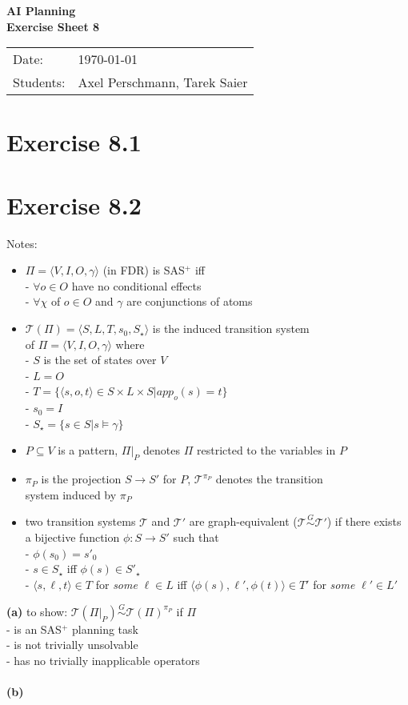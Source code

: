 \documentclass[11pt,a4paper]{article}
\newcommand{\sheetNr}{8}
\begin{document}
\begin{center}
\Huge{\textbf{AI Planning}}\\
\LARGE{\textbf{Exercise Sheet \sheetNr}}
\end{center}
\vspace{2cm}
\begin{tabular}{ll}
Date: & \today\\
Students: & Axel Perschmann, Tarek Saier
\end{tabular}

\section*{Exercise 8.1}

\section*{Exercise 8.2}
Notes:
\begin{itemize}
\item $\Pi=\langle V,I,O,\gamma\rangle$ (in FDR) is SAS$^+$ iff\\
\hphantom{tabtab}- $\forall o\in O$ have no conditional effects\\
\hphantom{tabtab}- $\forall \chi$ of $o\in O$ and $\gamma$ are conjunctions of atoms\\
\item $\mathscr{T}(\Pi)=\langle S,L,T,s_0,S_\star\rangle$ is the induced transition system\\
of $\Pi=\langle V,I,O,\gamma\rangle$ where\\
\hphantom{tabtab}- $S$ is the set of states over $V$\\
\hphantom{tabtab}- $L=O$\\
\hphantom{tabtab}- $T=\{\langle s,o,t\rangle\in S\times L\times S|app_o(s)=t\}$\\
\hphantom{tabtab}- $s_0=I$\\
\hphantom{tabtab}- $S_\star=\{s\in S|s\models\gamma\}$\\
\item $P\subseteq V$ is a pattern, $\Pi|_P$ denotes $\Pi$ restricted to the variables in $P$
\item $\pi_P$ is the projection $S\to S'$ for $P$, $\mathscr{T}^{\pi_P}$ denotes the transition\\
system induced by $\pi_P$
\item two transition systems $\mathscr{T}$ and $\mathscr{T}'$ are graph-equivalent ($\mathscr{T}\stackrel{G}{\sim}\mathscr{T}'$) if there exists a bijective function $\phi:S\to S'$ such that\\
\hphantom{tabtab}- $\phi(s_0)=s'_0$\\
\hphantom{tabtab}- $s\in S_\star$ iff $\phi(s)\in S'_\star$\\
\hphantom{tabtab}- $\langle s,\ell,t\rangle\in T$ for \emph{some} $\ell\in L$ iff $\langle\phi(s),\ell',\phi(t)\rangle\in T'$ for \emph{some} $\ell'\in L'$\\
\end{itemize}
\textbf{(a)} to show: $\mathscr{T}(\Pi|_P)\stackrel{G}{\sim}\mathscr{T}(\Pi)^{\pi_P}$ if $\Pi$\\
\hphantom{tabtab}- is an SAS$^+$ planning task\\
\hphantom{tabtab}- is not trivially unsolvable\\
\hphantom{tabtab}- has no trivially inapplicable operators\\
\\
\textbf{(b)}

\label{lastpage}
\end{document}
